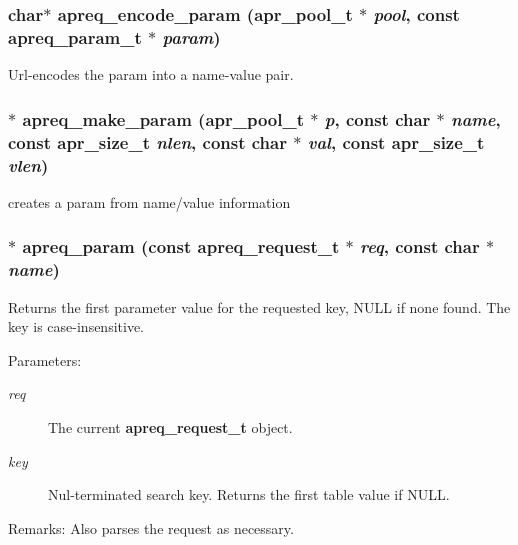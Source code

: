 \subsubsection{\setlength{\rightskip}{0pt plus 5cm}char$\ast$ apreq\_\-encode\_\-param ({\bf apr\_\-pool\_\-t} $\ast$ {\em pool}, const {\bf apreq\_\-param\_\-t} $\ast$ {\em param})}\label{group__params_a7}


Url-encodes the param into a name-value pair. 
\subsubsection{$\ast$ apreq\_\-make\_\-param ({\bf apr\_\-pool\_\-t} $\ast$ {\em p}, const char $\ast$ {\em name}, const {\bf apr\_\-size\_\-t} {\em nlen}, const char $\ast$ {\em val}, const {\bf apr\_\-size\_\-t} {\em vlen})}\label{group__params_a2}


creates a param from name/value information 
\subsubsection{$\ast$ apreq\_\-param (const {\bf apreq\_\-request\_\-t} $\ast$ {\em req}, const char $\ast$ {\em name})}\label{group__params_a4}


Returns the first parameter value for the requested key, NULL if none found. The key is case-insensitive. \begin{Desc}
\item[Parameters:]
\begin{description}
\item[{\em req}]The current {\bf apreq\_\-request\_\-t} object. \item[{\em key}]Nul-terminated search key. Returns the first table value if NULL. \end{description}
\end{Desc}
\begin{Desc}
\item[Remarks:]Also parses the request as necessary. \end{Desc}
